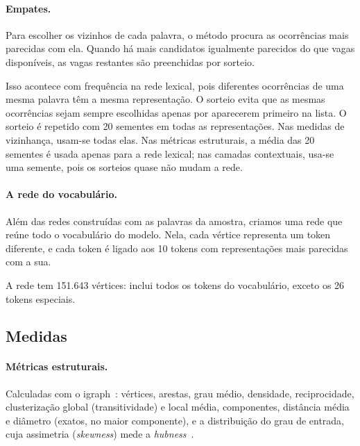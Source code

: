 \paragraph{Empates.} Para escolher os vizinhos de cada palavra, o método procura as ocorrências
mais parecidas com ela. Quando há mais candidatos igualmente parecidos do que vagas disponíveis,
as vagas restantes são preenchidas por sorteio.

Isso acontece com frequência na rede lexical, pois diferentes ocorrências de uma mesma palavra
têm a mesma representação. O sorteio evita que as mesmas ocorrências sejam sempre escolhidas
apenas por aparecerem primeiro na lista. O sorteio é repetido com 20 sementes em todas as
representações. Nas medidas de vizinhança, usam-se todas elas. Nas métricas estruturais, a
média das 20 sementes é usada apenas para a rede lexical; nas camadas contextuais, usa-se uma
semente, pois os sorteios quase não mudam a rede.

\paragraph{A rede do vocabulário.} Além das redes construídas com as palavras da amostra,
criamos uma rede que reúne todo o vocabulário do modelo. Nela, cada vértice representa um token
diferente, e cada token é ligado aos 10 tokens com representações mais parecidas com a sua.

A rede tem 151.643 vértices: inclui todos os tokens do vocabulário, exceto os 26 tokens especiais.

\subsection{Medidas}\label{sec:medidas}

\paragraph{Métricas estruturais.} Calculadas com o igraph~\cite{csardi2006}: vértices,
arestas, grau médio, densidade, reciprocidade, clusterização global (transitividade) e local
média, componentes, distância média e diâmetro (exatos, no maior componente), e a distribuição
do grau de entrada, cuja assimetria (\emph{skewness}) mede a \emph{hubness}~\cite{radovanovic2010}.

